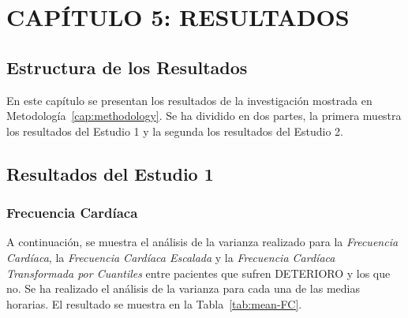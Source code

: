 \section{CAPÍTULO 5: RESULTADOS}\label{cap:results}

\subsection{Estructura de los Resultados}\label{sec:results}

En este capítulo se presentan los resultados de la investigación mostrada en Metodología~\ref{cap:methodology}. Se ha dividido en dos partes, la primera muestra los resultados del Estudio 1 y la segunda los resultados del Estudio 2.

\subsection{Resultados del Estudio 1}\label{sec:resultados-estudio-1}

\subsubsection{Frecuencia Cardíaca}

A continuación, se muestra el análisis de la varianza realizado para la \textit{Frecuencia Cardíaca}, la \textit{Frecuencia Cardíaca Escalada} y la \textit{Frecuencia Cardíaca Transformada por Cuantiles} entre pacientes que sufren DETERIORO y los que no. Se ha realizado el análisis de la varianza para cada una de las medias horarias. El resultado se muestra en la Tabla~\ref{tab:mean-FC}.  



